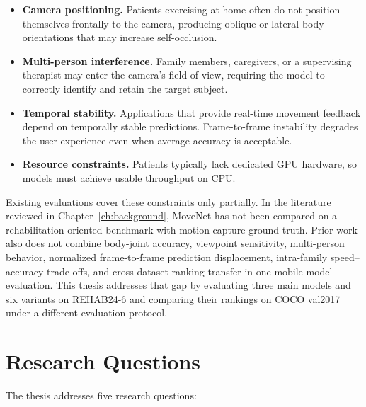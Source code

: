 \begin{itemize}
  \item \textbf{Camera positioning.} Patients exercising at home often do not position themselves frontally to the camera, producing oblique or lateral body orientations that may increase self-occlusion.
  \item \textbf{Multi-person interference.} Family members, caregivers, or a supervising therapist may enter the camera's field of view, requiring the model to correctly identify and retain the target subject.
  \item \textbf{Temporal stability.} Applications that provide real-time movement feedback depend on temporally stable predictions. Frame-to-frame instability degrades the user experience even when average accuracy is acceptable.
  \item \textbf{Resource constraints.} Patients typically lack dedicated GPU hardware, so models must achieve usable throughput on CPU.
\end{itemize}

Existing evaluations cover these constraints only partially. In the literature reviewed in Chapter~\ref{ch:background}, MoveNet has not been compared on a rehabilitation-oriented benchmark with motion-capture ground truth. Prior work also does not combine body-joint accuracy, viewpoint sensitivity, multi-person behavior, normalized frame-to-frame prediction displacement, intra-family speed--accuracy trade-offs, and cross-dataset ranking transfer in one mobile-model evaluation. This thesis addresses that gap by evaluating three main models and six variants on REHAB24-6 and comparing their rankings on COCO val2017 under a different evaluation protocol.


\section{Research Questions}
\label{sec:research-questions}

The thesis addresses five research questions:

